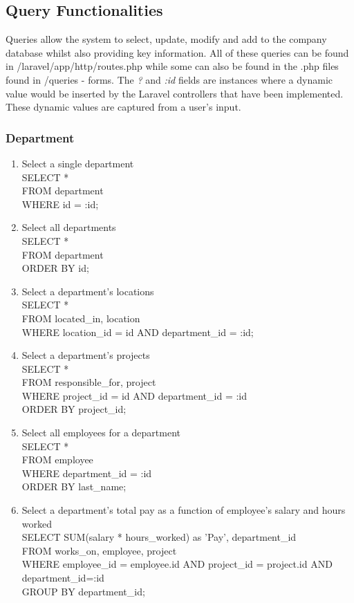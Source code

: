 \documentclass[fleqn, 11pt,letterpaper]{article}
\begin{document}
\subsection{Query Functionalities}
	Queries allow the system to select, update, modify and add to the company database whilst also providing key information. All of these queries can be found in /laravel/app/http/routes.php while some can also be found in the .php files found in /queries - forms. The \textit{?} and \textit{:id} fields are instances where a dynamic value would be inserted by the Laravel controllers that have been implemented. These dynamic values are captured from a user's input.
	\subsubsection{Department}
	\begin{enumerate}
		\item Select a single department\\ SELECT * \\FROM department \\WHERE id = :id;
		\item Select all departments \\SELECT * \\FROM department \\ORDER BY id;
		\item Select a department's locations\\SELECT * \\FROM located\_in, location \\ WHERE location\_id = id AND department\_id = :id;
		\item Select a department's projects \\SELECT *\\ FROM responsible\_for, project \\WHERE project\_id = id AND department\_id = :id\\ ORDER BY project\_id;
		\item Select all employees for a department \\SELECT * \\FROM employee \\WHERE department\_id = :id \\ORDER BY last\_name;
		\item Select a department's total pay as a function of employee's salary and hours worked\\SELECT SUM(salary * hours\_worked) as 'Pay', department\_id \\FROM works\_on, employee, project \\WHERE employee\_id = employee.id AND project\_id = project.id AND department\_id=:id \\GROUP BY department\_id;

\end{enumerate}
\end{document}
